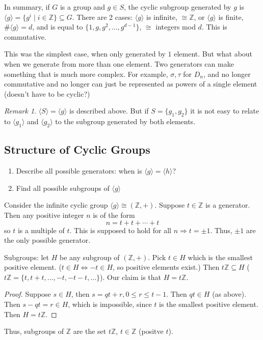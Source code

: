 \documentclass{article}
\theoremstyle{plain}
\theoremstyle{remark}
\newtheorem{remark}{Remark}
\newcommand{\Z}{{\mathbb Z}}
\begin{document}
In summary, if $G$ is a group and $g \in S$,
the cyclic subgroup generated by $g$ is 
$\langle g \rangle = \{g^i \mid i \in \Z\} \subseteq G$.
There are 2 cases: $\langle g \rangle$ is infinite, $\cong \Z$,
or $\langle g \rangle$ is finite, $\#\langle g \rangle = d$,
and is equal to $\{1,g,g^2,\dots,g^{d-1}\}$, $\cong$ integers mod $d$.
This is commutative.

This was the simplest case, when only generated by $1$ element.
But what about when we generate from more than one element.
Two generators can make something that is much more complex.
For example, $\sigma,\tau$ for $D_n$,
and no longer commutative and no longer can just be
represented as powers of a single element
(doesn't have to be cyclic?)

\begin{remark}
	$\langle S \rangle = \langle g \rangle$ is described above.
	But if $S = \{g_1,g_2\}$
	it is not easy to relate to $\langle g_1\rangle$ and $\langle g_2 \rangle$
	to the subgroup generated by both elements.
\end{remark}

\subsection{Structure of Cyclic Groups}
\begin{enumerate}
	\item Describe all possible generators:
		when is $\langle g \rangle = \langle h \rangle$?
	\item Find all possible subgroups of $\langle g \rangle$
\end{enumerate}
Consider the infinite cyclic group $\langle g \rangle \cong (\Z,+)$.
Suppose $t \in \Z$ is a generator.
Then any positive integer $n$ is of the form
\[
	n = t + t + \cdots + t
\]
so $t$ is a multiple of $t$.
This is supposed to hold for all $n \Rightarrow  t = \pm 1$.
Thus, $\pm 1$ are the only possible generator.

Subgroups: let $H$ be any subgroup of $(\Z, +)$.
Pick $t \in H$ which is the smallest positive element.
($t \in H \iff -t \in H$, so positive elements exist.)
Then $t\Z \subseteq H$ ($t\Z = \{t,t+t,\dots,-t,-t-t,\dots\}$).
Our claim is that $H = t\Z$.
\begin{proof}
	Suppose $s \in H$, then $s = qt+r, 0\leq r \leq t-1$.
	Then $qt \in H$ (as above).
	Then $s-qt = r \in H$, which is impossible,
	since $t$ is the smallest positive element.
	Then $H = t\Z$.
\end{proof}
Thus, subgroups of $\Z$ are the set $t\Z$, $t\in\Z$ (positve $t$).
\end{document}

